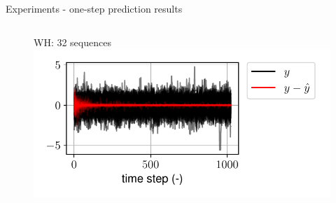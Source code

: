 \documentclass{beamer}
\begin{document}
\begin{frame}{Experiments - one-step prediction results}
\begin{columns}[t]
\begin{center}
\begin{figure}
WH: 32 sequences
\includegraphics[width=\textwidth]{fig/wh_one_step_batch.pdf}
\end{figure}
\end{center}
\end{columns}
\end{frame}
\end{document}
